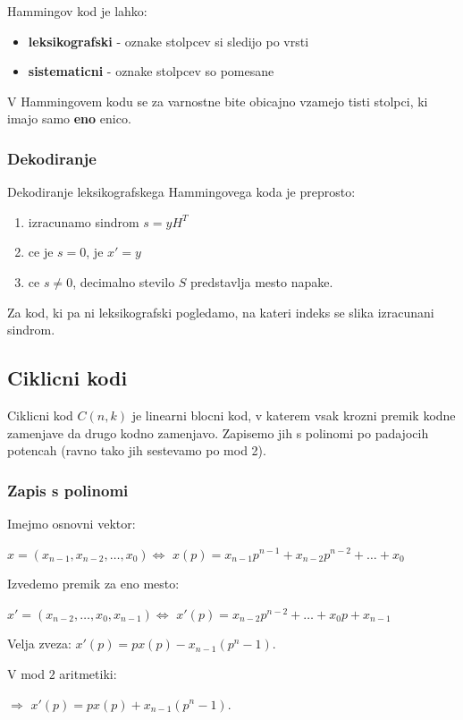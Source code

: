 \documentclass{article}
\begin{document}
\begin{multicols}{4}
Hammingov kod je lahko:
\begin{itemize}
    \item \textbf{leksikografski} - oznake stolpcev si sledijo po vrsti
    \item \textbf{sistematicni} - oznake stolpcev so pomesane
\end{itemize}

 V Hammingovem kodu se za varnostne bite obicajno vzamejo tisti stolpci, ki imajo samo \textbf{eno} enico.

\subsubsection{Dekodiranje}
Dekodiranje leksikografskega Hammingovega koda je preprosto:
\begin{enumerate}
    \item izracunamo sindrom $s = yH^T$
    \item ce je $s = 0$, je $x' = y$
    \item ce $s \neq 0$, decimalno stevilo $S$ predstavlja mesto napake.
\end{enumerate}
Za kod, ki pa ni leksikografski pogledamo, na kateri indeks se slika izracunani sindrom.

\subsection{Ciklicni kodi}
Ciklicni kod $C(n, k)$ je linearni blocni kod, v katerem vsak krozni premik kodne zamenjave
da drugo kodno zamenjavo. Zapisemo jih s polinomi po padajocih potencah (ravno tako jih sestevamo po mod 2). 

\subsubsection{Zapis s polinomi}
Imejmo osnovni vektor: 
\begin{center}
    $x = (x_{n-1}, x_{n-2}, \dots, x_0) \Leftrightarrow$
    $x(p) = x_{n-1}p^{n-1} + x_{n-2}p^{n-2} + \dots + x_0$ 
\end{center}
Izvedemo premik za eno mesto:
\begin{center}
    $x' = (x_{n-2}, \dots, x_0, x_{n-1}) \Leftrightarrow$
    $x'(p) = x_{n-2}p^{n-2} + \dots + x_0p + x_{n-1}$ 
\end{center}
Velja zveza: $x'(p) = px(p) - x_{n-1}(p^n -1)$.

V mod $2$ aritmetiki:
\begin{center}
    $\Rightarrow$ $x'(p) = px(p) + x_{n-1}(p^n -1)$.
\end{center}


\end{multicols}
\end{document}
